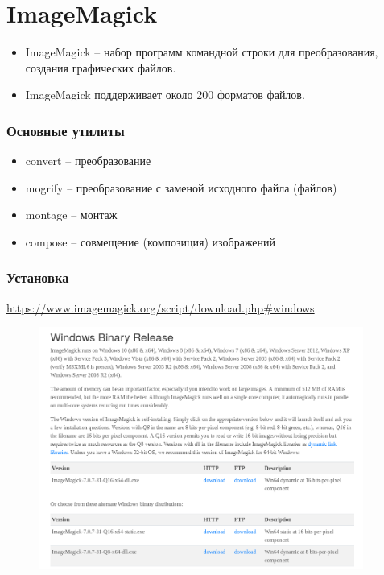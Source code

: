\documentclass[11pt, compress]{beamer}
\renewcommand{\emph}[1]{\textcolor{dark-blue}{#1}}
\begin{document}
\section{ImageMagick}

\begin{frame}[c, fragile]
\begin{itemize}
   \item \emph{ImageMagick} -- набор программ командной строки для преобразования, создания графических файлов.
   \item \emph{ImageMagick} поддерживает около 200 форматов файлов.   
\end{itemize} 
\end{frame}

\begin{frame}[c, fragile]
\frametitle{Основные утилиты}
\begin{itemize}
	\item \emph{convert} -- преобразование
	\item \emph{mogrify} -- преобразование с заменой исходного файла (файлов)
  \item \emph{montage} -- монтаж
	\item \emph{compose} -- совмещение (композиция) изображений
\end{itemize}
\end{frame}

\begin{frame}[t]
\frametitle{Установка}
{\small \url{https://www.imagemagick.org/script/download.php\#windows}}
\begin{figure}[htbp]
\centering
\includegraphics[width=0.95\textwidth]{imagemagick.png}
\end{figure}
  
\end{frame}
\end{document}
